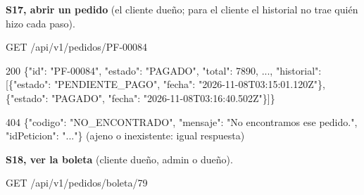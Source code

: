 \textbf{S17, abrir un pedido} (el cliente dueño; para el cliente el historial no trae quién hizo cada paso).


\begin{codigo}
GET /\allowbreak{}api/\allowbreak{}v1/\allowbreak{}pedidos/\allowbreak{}PF-\allowbreak{}00084\par
\end{codigo}

\begin{codigo}
200 \{"id":\allowbreak{} "PF-\allowbreak{}00084",\allowbreak{} "estado":\allowbreak{} "PAGADO",\allowbreak{} "total":\allowbreak{} 7890,\allowbreak{} .\allowbreak{}.\allowbreak{}.\allowbreak{},\allowbreak{} "historial":\allowbreak{} [\allowbreak{}\{"estado":\allowbreak{} "PENDIENTE\_\allowbreak{}PAGO",\allowbreak{} "fecha":\allowbreak{} "2026-\allowbreak{}11-\allowbreak{}08T03:\allowbreak{}15:\allowbreak{}01.\allowbreak{}120Z"\},\allowbreak{} \{"estado":\allowbreak{} "PAGADO",\allowbreak{} "fecha":\allowbreak{} "2026-\allowbreak{}11-\allowbreak{}08T03:\allowbreak{}16:\allowbreak{}40.\allowbreak{}502Z"\}]\}\par
404 \{"codigo":\allowbreak{} "NO\_\allowbreak{}ENCONTRADO",\allowbreak{} "mensaje":\allowbreak{} "No encontramos ese pedido.\allowbreak{}",\allowbreak{} "idPeticion":\allowbreak{} ".\allowbreak{}.\allowbreak{}.\allowbreak{}"\}   (\allowbreak{}ajeno o inexistente:\allowbreak{} igual respuesta)\par
\end{codigo}

\textbf{S18, ver la boleta} (cliente dueño, admin o dueño).


\begin{codigo}
GET /\allowbreak{}api/\allowbreak{}v1/\allowbreak{}pedidos/\allowbreak{}boleta/\allowbreak{}79\par
\end{codigo}

